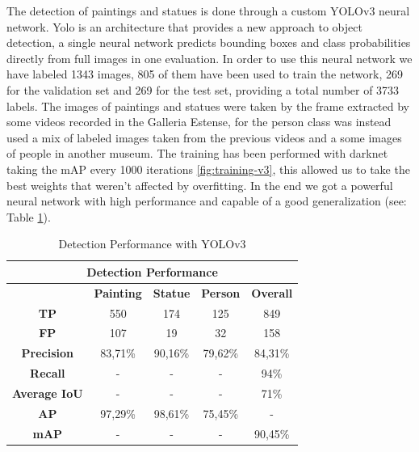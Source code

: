 The detection of paintings and statues is done through a custom YOLOv3 neural network.\cite{yolov3}
Yolo is an architecture that provides a new approach to object detection, a single neural network predicts bounding boxes and class probabilities directly from full images in one evaluation.
In order to use this neural network we have labeled 1343 images, 805 of them have been used to train the network, 269 for the validation set and 269 for the test set, providing a total number of 3733 labels. The images of paintings and statues were taken by the frame extracted by some videos recorded in the Galleria Estense, for the person class was instead used a mix of labeled images taken from the previous videos and a some images of people in another museum.
The training has been performed with darknet \cite{darknet} taking the mAP every 1000 iterations \ref{fig:training-v3}, this allowed us to take the best weights that weren't affected by overfitting.
In the end we got a powerful neural network with high performance and capable of a good generalization (see: Table \ref{tab:detection_performance}).

\begin{table}[ht]
    \centering
\begin{tabular}{|c|c|c|c|c|}
\hline
\multicolumn{5}{|c|}{\textbf{Detection Performance}}       \\ \hline
\multicolumn{1}{|l|}{} & \textbf{Painting} & \textbf{Statue} & \textbf{Person} & \textbf{Overall} \\ \hline
\textbf{TP}        & 550     & 174     & 125     & 849     \\ \hline
\textbf{FP}        & 107     & 19      & 32      & 158     \\ \hline
\textbf{Precision} & 83,71\% & 90,16\% & 79,62\% & 84,31\% \\ \hline
\textbf{Recall}    & -       & -       & -       & 94\%    \\ \hline
\textbf{Average IoU}       & -       & -       & -       & 71\%    \\ \hline
\textbf{AP}        & 97,29\% & 98,61\% & 75,45\% & -       \\ \hline
\textbf{mAP}       & -       & -       & -       & 90,45\% \\ \hline
\end{tabular}
\caption{Detection Performance with YOLOv3}
    \label{tab:detection_performance}
\end{table}



